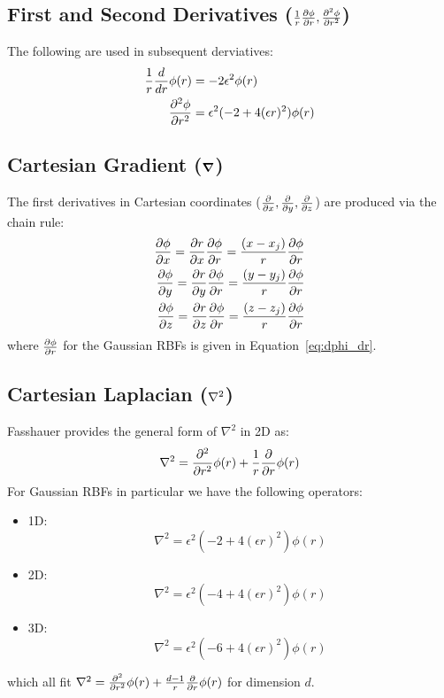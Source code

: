\documentclass[11pt]{report}
\begin{document}
{\subsection{First and Second Derivatives ($\frac{1}{r}\frac{\partial \phi}{\partial r}, \frac{\partial^2 \phi}{\partial r^2}$)}
The following are used in subsequent derviatives:
\begin{align}
\frac{1}{r}\frac{d }{d r}\phi(r) & = -2 \epsilon^2 \phi(r) \label{eq:dphi_dr} \\
\frac{\partial^2 \phi}{\partial r^2} & = \epsilon^2(-2 + 4(\epsilon r)^2)\phi(r)
\end{align}



\subsection{Cartesian Gradient ($\grad$)}
\label{sec:rbffd_grad_weights}
The first derivatives in Cartesian coordinates ($\frac{\partial }{\partial x}, \frac{\partial }{\partial y}, \frac{\partial }{\partial z}$) are produced via the chain rule:
	\begin{align*} 
	 \frac{\partial \phi}{\partial x} = \frac{\partial r}{\partial x} \frac{\partial \phi}{\partial r} = \frac{(x-x_{j})}{r} \frac{\partial \phi}{\partial r} \\
	 \frac{\partial \phi}{\partial y} = \frac{\partial r}{\partial y} \frac{\partial \phi}{\partial r} = \frac{(y-y_{j})}{r} \frac{\partial \phi}{\partial r} \\
	 \frac{\partial \phi}{\partial z} = \frac{\partial r}{\partial z} \frac{\partial \phi}{\partial r} = \frac{(z-z_{j})}{r} \frac{\partial \phi}{\partial r}
	\end{align*}
where $\frac{\partial \phi}{\partial r}$ for the Gaussian RBFs is given in Equation~\ref{eq:dphi_dr}. 


\subsection{Cartesian Laplacian ($\Laplacian$)}
Fasshauer \cite{Fasshauer2007} provides the general form of $\nabla^2$ in 2D as: 
\begin{align*}
\nabla^2 = \frac{\partial^2 }{\partial r^2}\phi(r) + \frac{1}{r}\frac{\partial }{\partial r} \phi(r) 
\end{align*}
For Gaussian RBFs in particular we have the following operators:
\begin{itemize}
\item 1D: $$\nabla^2 = \epsilon^2 (-2 + 4 (\epsilon r)^2) \phi(r)$$
\item 2D: $$\nabla^2 = \epsilon^2 (-4 + 4 (\epsilon r)^2) \phi(r)$$
\item 3D: $$\nabla^2 = \epsilon^2 (-6 + 4 (\epsilon r)^2) \phi(r)$$
\end{itemize}
which all fit $\nabla^2 = \frac{\partial^2 }{\partial r^2}\phi(r) + \frac{d - 1}{r}\frac{\partial }{\partial r} \phi(r)$ for dimension $d$.

}
\end{document}
